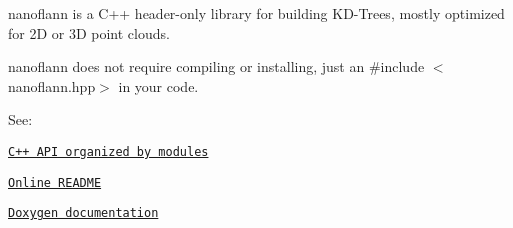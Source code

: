nanoflann is a C++ header-\/only library for building K\+D-\/\+Trees, mostly optimized for 2D or 3D point clouds.

nanoflann does not require compiling or installing, just an \#include $<$nanoflann.\+hpp$>$ in your code.

See\+:
\begin{DoxyItemize}
\item \href{modules.html}{\tt C++ A\+PI organized by modules}
\item \href{https://github.com/jlblancoc/nanoflann}{\tt Online R\+E\+A\+D\+ME}
\item \href{http://jlblancoc.github.io/nanoflann/}{\tt Doxygen documentation} 
\end{DoxyItemize}